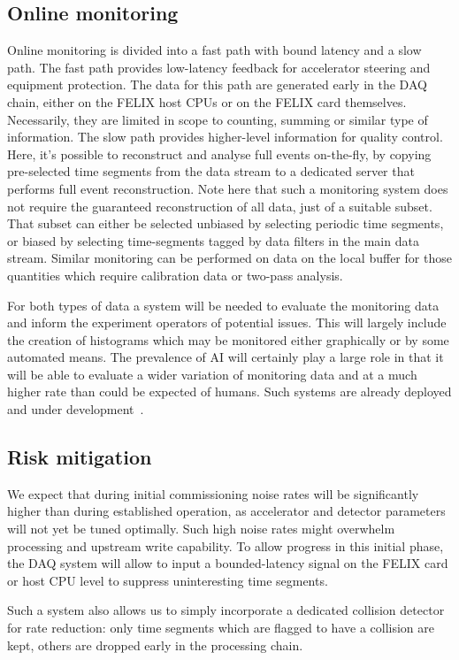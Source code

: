 \subsection{Online monitoring}\label{subsec:online_mon}
Online monitoring is divided into a fast path with bound latency and a slow path. The fast path provides low-latency feedback for accelerator steering and equipment protection. The data for this path are generated early in the DAQ chain, either on the FELIX host CPUs or on the FELIX card themselves. Necessarily, they are limited in scope to counting, summing or similar type of information. The slow path provides higher-level information for quality control. Here, it's possible to reconstruct and analyse full events on-the-fly, by copying pre-selected time segments from the data stream to a dedicated server that performs full event reconstruction. Note here that such a monitoring system does not require the guaranteed reconstruction of all data, just of a suitable subset. That subset can either be selected unbiased by selecting periodic time segments, or biased by selecting time-segments tagged by data filters in the main data stream.  Similar monitoring can be performed on data on the local buffer for those quantities which require calibration data or two-pass analysis.

For both types of data a system will be needed to evaluate the monitoring data and inform the experiment operators of potential issues. This will largely include the creation of histograms which may be monitored either graphically or by some automated means. The prevalence of AI will certainly play a large role in that it will be able to evaluate a wider variation of monitoring data and at a much higher rate than could be expected of humans. Such systems are already deployed and under development~\cite{Hydra2021}. 

\subsection{Risk mitigation}
We expect that during initial commissioning noise rates will be significantly higher than during established operation, as accelerator and detector parameters will not yet be tuned optimally. Such high noise rates might overwhelm processing and upstream write capability. To allow progress in this initial phase, the DAQ system will allow to input a bounded-latency signal on the FELIX card or host CPU level to suppress uninteresting time segments.

Such a system also allows us to simply incorporate a dedicated collision detector for rate reduction: only time segments which are flagged to have a collision are kept, others are dropped early in the processing chain. 


